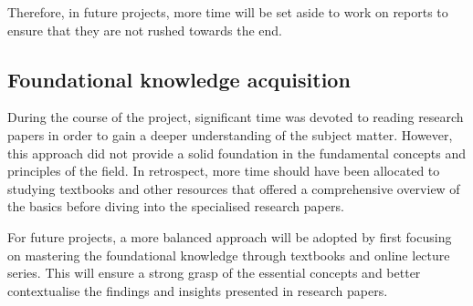 Therefore, in future projects, more time will be set aside to work on reports to ensure that they are not rushed towards the end.

\subsection{Foundational knowledge acquisition}

During the course of the project, significant time was devoted to reading research papers in order to gain a deeper understanding of the subject matter. However, this approach did not provide a solid foundation in the fundamental concepts and principles of the field. In retrospect, more time should have been allocated to studying textbooks and other resources that offered a comprehensive overview of the basics before diving into the specialised research papers.

For future projects, a more balanced approach will be adopted by first focusing on mastering the foundational knowledge through textbooks and online lecture series. This will ensure a strong grasp of the essential concepts and better contextualise the findings and insights presented in research papers.
